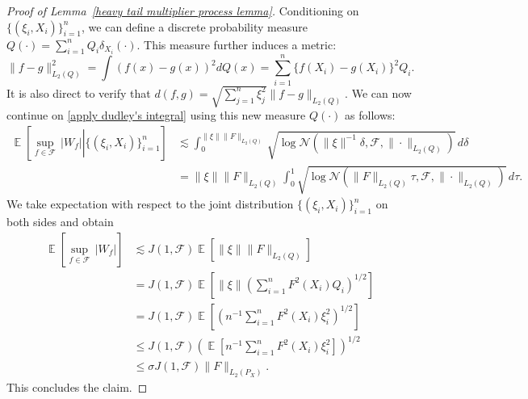 \documentclass[12pt]{article}
\DeclareMathOperator*{\E}{\mathbb{E}}
\begin{document}
\begin{appendices}
\begin{proof}[Proof of Lemma~\ref{heavy tail multiplier process lemma}]
Conditioning on $\{(\xi_i,X_i)\}_{i=1}^n$, we can define a  discrete probability measure $Q(\cdot) = \sum_{i=1}^n Q_i\delta_{X_i}(\cdot)$. This measure further induces a metric: 
\begin{equation}\nonumber
   \|f - g\|^2_{L_2(Q)} = \int (f(x) - g(x))^2 dQ(x) = \sum_{i=1}^n \{f(X_i) - g(X_i)\}^2  Q_i.  
\end{equation}
It is also direct to verify that $ d(f,g) = \sqrt{\sum_{j=1}^n \xi_j^2}\|f-g\|_{L_2(Q)}$.
We can now continue on \eqref{apply dudley's integral} using this new measure $Q(\cdot)$ as follows:
\begin{equation}\nonumber
\begin{aligned}
     \E\left[\left.\sup_{f\in\mathcal{F}}\,  |W_f|\right|\{(\xi_i,X_i)\}_{i=1}^n\right] 
     & \lesssim \int_0^{\|\xi\|\|F\|_{L_2(Q)}} \sqrt{\log \mathcal{N}(\|\xi\|^{-1}\delta, \mathcal{F}, \|\cdot\|_{L_2(Q)})} \, d\delta\\
     & = \|\xi\|\|F\|_{L_2(Q)}\int_0^1 \sqrt{\log \mathcal{N}(\|F\|_{L_2(Q)}\tau, \mathcal{F}, \|\cdot\|_{L_2(Q)})} \, d\tau.
\end{aligned}
\end{equation}
We take expectation with respect to the joint distribution $\{(\xi_i,X_i)\}_{i=1}^n$ on both sides and obtain
\begin{equation}\nonumber
\begin{aligned}
 \E\left[\sup_{f\in\mathcal{F}} \, \left|W_f\right|\right] 
 & \lesssim J(1,\mathcal{F})\E[\|\xi\|\|F\|_{L_2(Q)} ]\\
 & = J(1,\mathcal{F})\E\left[\|\xi\|\left(\sum_{i=1}^n F^2(X_i) Q_i\right)^{1/2}\right]\\
 & =J(1,\mathcal{F})\E\left[\left(n^{-1}\sum_{i=1}^n F^2(X_i) \xi_i^2\right)^{1/2}\right]\\
 & \leq J(1,\mathcal{F})\left(\E\left[n^{-1}\sum_{i=1}^n F^2(X_i) \xi_i^2\right]\right)^{1/2} \\
 & \leq \sigma J(1,\mathcal{F}) \|F\|_{L_2(P_X)}.
\end{aligned}
\end{equation}
This concludes the claim.
\end{proof}


\end{appendices}
\end{document}
